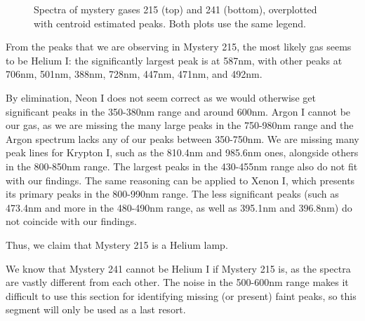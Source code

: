 \documentclass[twocolumn]{aastex702}
\begin{document}
		\begin{figure}
			\caption{Spectra of mystery gases 215 (top) and 241 (bottom), overplotted with centroid estimated peaks. Both plots use the same legend.}
			\label{fig:31-mystery}
		\end{figure}
			
			From the peaks that we are observing in Mystery 215, the most likely gas seems to be Helium I: the significantly largest peak is at 587nm, with other peaks at 706nm, 501nm, 388nm, 728nm, 447nm, 471nm, and 492nm.
			
			By elimination, Neon I does not seem correct as we would otherwise get significant peaks in the 350-380nm range and around 600nm. Argon I cannot be our gas, as we are missing the many large peaks in the 750-980nm range and the Argon spectrum lacks any of our peaks between 350-750nm. We are missing many peak lines for Krypton I, such as the 810.4nm and 985.6nm ones, alongside others in the 800-850nm range. The largest peaks in the 430-455nm range also do not fit with our findings. The same reasoning can be applied to Xenon I, which presents its primary peaks in the 800-990nm range. The less significant peaks (such as 473.4nm and more in the 480-490nm range, as well as 395.1nm and 396.8nm) do not coincide with our findings.
			
			Thus, we claim that Mystery 215 is a Helium lamp.
			
			We know that Mystery 241 cannot be Helium I if Mystery 215 is, as the spectra are vastly different from each other. The noise in the 500-600nm range makes it difficult to use this section for identifying missing (or present) faint peaks, so this segment will only be used as a last resort.
\end{document}
